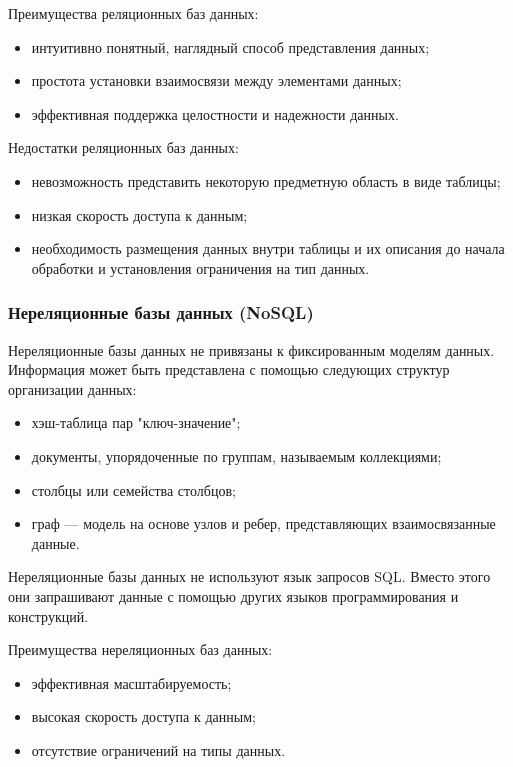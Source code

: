 Преимущества реляционных баз данных:

\begin{itemize}
	\item интуитивно понятный, наглядный способ представления данных;
	\item простота установки взаимосвязи между элементами данных;
	\item эффективная поддержка целостности и надежности данных.
\end{itemize}

Недостатки реляционных баз данных:

\begin{itemize}
	\item невозможность представить некоторую предметную область в виде таблицы;
	\item низкая скорость доступа к данным;
	\item необходимость размещения данных внутри таблицы и их описания до начала обработки и установления ограничения на тип данных.
\end{itemize}

\subsubsection{Нереляционные базы данных (NoSQL)}

Нереляционные базы данных не привязаны к фиксированным моделям данных. Информация может быть представлена с помощью следующих структур организации данных:

\begin{itemize}
	\item хэш-таблица пар "ключ-значение";
	\item документы, упорядоченные по группам, называемым коллекциями;
	\item столбцы или семейства столбцов;
	\item граф --- модель на основе узлов и ребер, представляющих взаимосвязанные данные.
\end{itemize}

Нереляционные базы данных не используют язык запросов SQL. Вместо этого они запрашивают данные с помощью других языков программирования и конструкций.

Преимущества нереляционных баз данных:

\begin{itemize}
	\item эффективная масштабируемость;
	\item высокая скорость доступа к данным;
	\item отсутствие ограничений на типы данных.
\end{itemize}

